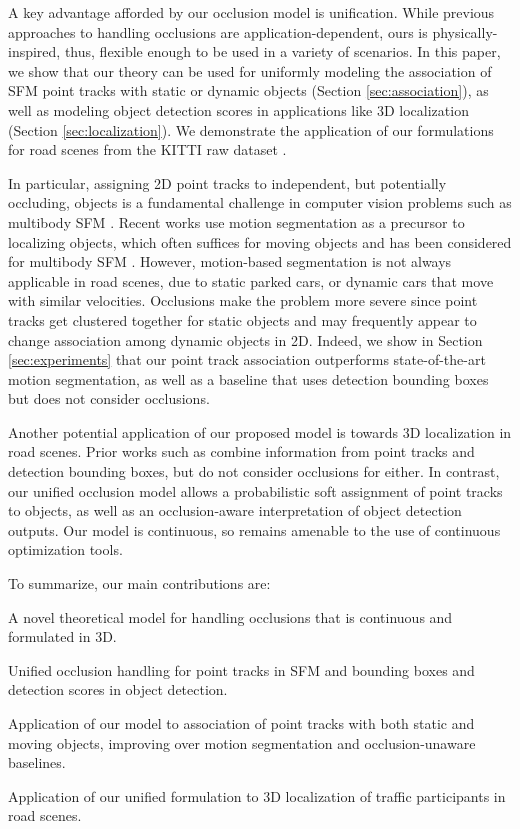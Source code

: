 A key advantage afforded by our occlusion model is unification. While previous approaches to handling occlusions are application-dependent, ours is physically-inspired, thus, flexible enough to be used in a variety of scenarios. In this paper, we show that our theory can be used for uniformly modeling the association of SFM point tracks with static or dynamic objects (Section \ref{sec:association}), as well as modeling object detection scores in applications like 3D localization (Section \ref{sec:localization}). We demonstrate the application of our formulations for road scenes from the KITTI raw dataset \cite{Geiger_etal_2012}.


In particular, assigning 2D point tracks to independent, but potentially occluding, objects is a fundamental challenge in computer vision problems such as multibody SFM \cite{Ozden_etal_2010}. Recent works use motion segmentation \cite{Rao_etal_2010,Brox_Malik_2010} as a precursor to localizing objects, which often suffices for moving objects \cite{Tron_Vidal_2007} and has been considered for multibody SFM \cite{Kundu_etal_2011}. However, motion-based segmentation is not always applicable in road scenes, due to static parked cars, or dynamic cars that move with similar velocities. Occlusions make the problem more severe since point tracks get clustered together for static objects and may frequently appear to change association among dynamic objects in 2D.
Indeed, we show in Section \ref{sec:experiments} that our point track association outperforms state-of-the-art motion segmentation, as well as a baseline that uses detection bounding boxes but does not consider occlusions.

Another potential application of our proposed model is towards 3D localization in road scenes. Prior works such as \cite{Song_Chandraker_2015} combine information from point tracks and detection bounding boxes, but do not consider occlusions for either. In contrast, our unified occlusion model allows a probabilistic soft assignment of point tracks to objects, as well as an occlusion-aware interpretation of object detection outputs. Our model is continuous, so remains amenable to the use of continuous optimization tools.

To summarize, our main contributions are:
\vspace{-0.2cm}
\begin{tight_itemize}
\item A novel theoretical model for handling occlusions that is continuous and formulated in 3D.
\item Unified occlusion handling for point tracks in SFM and bounding boxes and detection scores in object detection.
\item Application of our model to association of point tracks with both static and moving objects, improving over motion segmentation and occlusion-unaware baselines.
\item Application of our unified formulation to 3D localization of traffic participants in road scenes.
\end{tight_itemize}



